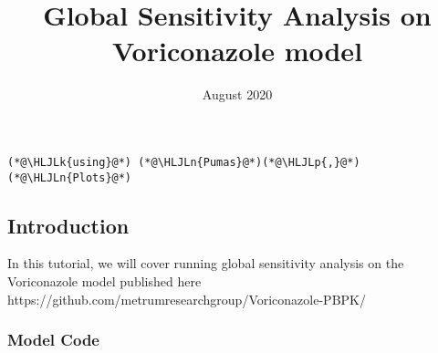 \documentclass[12pt,a4paper]{article}
\title{ Global Sensitivity Analysis on Voriconazole model }
\date{ August 2020 }
\newcommand{\HLJLk}[1]{\textcolor[RGB]{148,91,176}{\textbf{#1}}}
\newcommand{\HLJLn}[1]{#1}
\newcommand{\HLJLp}[1]{#1}
\begin{document}
\maketitle

\begin{lstlisting}
(*@\HLJLk{using}@*) (*@\HLJLn{Pumas}@*)(*@\HLJLp{,}@*) (*@\HLJLn{Plots}@*)
\end{lstlisting}


\subsection{Introduction}
In this tutorial, we will cover running global sensitivity analysis on the Voriconazole model published here https://github.com/metrumresearchgroup/Voriconazole-PBPK/

\subsubsection{Model Code}
\end{document}
